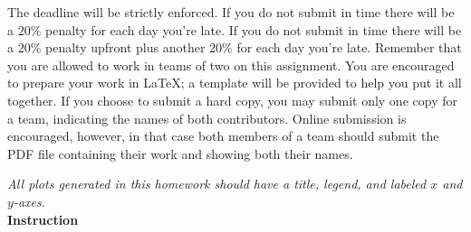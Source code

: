 %
%
%
The deadline will be strictly enforced. If you do not submit in time there will be a $20\%$ penalty for each day you're late. If you do not submit in time there will be a $20\%$ penalty upfront plus another $20\%$ for  each day you're late. Remember that you are allowed to work in teams of two on this assignment. You are encouraged to prepare your work in \LaTeX{}; a template will be provided to help you put it all together. If you choose  to submit a hard copy, you may submit only one copy for a team, indicating the names of both contributors. Online submission is encouraged, however, in that case both members of a team should submit the PDF file containing  their work and showing both their names.

\emph{All plots generated in this homework should have a title, legend, and labeled $x$ and $y$-axes.} \\[15pt]

\textbf{Instruction}

